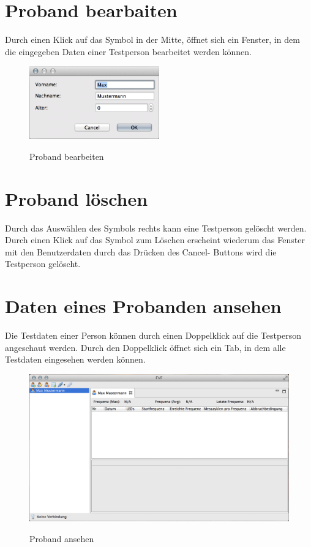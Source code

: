 \documentclass[11pt,accentcolor=tud2a,colorback,noheadingspace]{tudreport}
\begin{document}
\section{Proband bearbaiten}
\label{probands:proband-bearbaiten}
Durch einen Klick auf das Symbol in der Mitte, öffnet sich ein Fenster, in 
dem die eingegeben Daten einer Testperson bearbeitet werden können.

\begin{figure}[H]
	\centering
	\includegraphics[width=0.5\textwidth]{person_edit.png}
	\label{fig:proband-edit}
	\caption{Proband bearbeiten}
\end{figure}


\section{Proband löschen}
\label{probands:proband-loschen}
Durch das Auswählen des Symbols rechts kann eine Testperson gelöscht werden. 
Durch einen Klick auf das Symbol zum Löschen erscheint wiederum das Fenster 
mit den Benutzerdaten durch das Drücken des Cancel- Buttons wird die Testperson 
gelöscht.


\section{Daten eines Probanden ansehen}
\label{probands:daten-eines-probanden-ansehen}
Die Testdaten einer Person können durch einen Doppelklick auf die Testperson 
angeschaut werden. Durch den Doppelklick öffnet sich ein Tab, in dem alle 
Testdaten eingesehen werden können.

\begin{figure}[H]
	\includegraphics[width=\textwidth]{person_opened.png}
	\label{fig:proband-open}
	\caption{Proband ansehen}
\end{figure}
\end{document}
